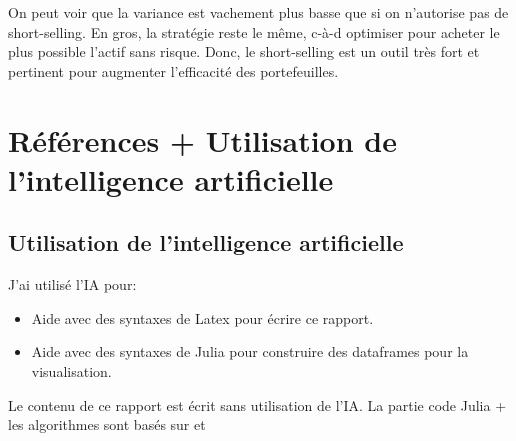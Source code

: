 \documentclass[letterpaper,11pt]{article}
\newcommand{\?}{\stackrel{?}{=}}
\begin{document}
On peut voir que la variance est vachement plus basse que si on n'autorise pas de short-selling. En gros, la stratégie reste le même, c-à-d optimiser pour acheter le plus possible l'actif sans risque.
Donc, le short-selling est un outil très fort et pertinent pour augmenter l'efficacité des portefeuilles.

\newpage
\section*{Références + Utilisation de l'intelligence artificielle}

\printbibliography

\subsection*{Utilisation de l'intelligence artificielle}
J'ai utilisé l'IA pour:
\begin{itemize}
    \item Aide avec des syntaxes de Latex pour écrire ce rapport.
    \item Aide avec des syntaxes de Julia pour construire des dataframes pour la visualisation.
\end{itemize}
Le contenu de ce rapport est écrit sans utilisation de l'IA. La partie code Julia + les algorithmes sont basés sur \cite{gurobi} et \cite{web}
\end{document}
